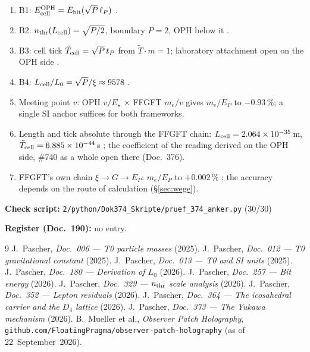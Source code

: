 \begin{enumerate}
\item B1: $E_{\rm cell}^{\rm OPH}=E_{\rm bit}(\sqrt P\,\ell_P)$ \BM.
\item B2: $n_{\rm thr}(L_{\rm cell})=\sqrt{P/2}$, boundary $P=2$, OPH below it \BM.
\item B3: cell tick $\tilde T_{\rm cell}=\sqrt P\,t_P$ from $\tilde T\cdot m=1$;
  laboratory attachment open on the OPH side \SM.
\item B4: $L_{\rm cell}/L_0=\sqrt P/\xi\approx 9578$ \KM.
\item Meeting point $v$: OPH $v/E_\star$ \QM{} $\times$ FFGFT $m_e/v$ \KM{}
  gives $m_e/E_P$ to $-0.93\,\%$; a single SI anchor suffices for both
  frameworks.
\item Length and tick absolute through the FFGFT chain: $L_{\rm cell}=2.064\times10^{-35}$\,m,
  $\tilde T_{\rm cell}=6.885\times10^{-44}$\,s \KM; the coefficient of the reading
  derived on the OPH side, \#740 as a whole open there (Doc.~376).
\item FFGFT's own chain $\xi\to G\to E_P$: $m_e/E_P$ to $+0.002\,\%$ \KM;
  the accuracy depends on the route of calculation (§\ref{sec:wege}).
\end{enumerate}

\medskip
\noindent\textbf{Check script:} \texttt{2/python/Dok374\_Skripte/pruef\_374\_anker.py} (30/30)

\medskip
\noindent\textbf{Register (Doc.~190):} no entry.

\begin{thebibliography}{9}
 J.~Pascher, \emph{Doc.~006 --- T0 particle masses} (2025).
 J.~Pascher, \emph{Doc.~012 --- T0 gravitational constant} (2025).
 J.~Pascher, \emph{Doc.~013 --- T0 and SI units} (2025).
 J.~Pascher, \emph{Doc.~180 --- Derivation of $L_0$} (2026).
 J.~Pascher, \emph{Doc.~257 --- Bit energy} (2026).
 J.~Pascher, \emph{Doc.~329 --- $n_{\rm thr}$ scale analysis} (2026).
 J.~Pascher, \emph{Doc.~352 --- Lepton residuals} (2026).
 J.~Pascher, \emph{Doc.~364 --- The icosahedral carrier and the $D_4$ lattice} (2026).
 J.~Pascher, \emph{Doc.~373 --- The Yukawa mechanism} (2026).
 B.~Mueller et al., \emph{Observer Patch Holography},
  \texttt{github.com/FloatingPragma/observer-patch-holography} (as of 22~September~2026).
\end{thebibliography}
